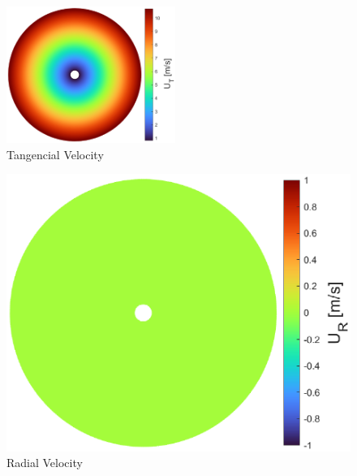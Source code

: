 {\begin{figure}[!htb]
    \centering
    \includegraphics[width=0.49\textwidth]{Figures/comp_method/sim_B/U_T.eps}
    \caption[Tangencial Velocity]{Tangencial Velocity}
    \label{fig:ASDASDA}
\end{figure}

\begin{figure}[!htb]
    \centering
    \begin{minipage}{.49\textwidth}
      \centering
      \includegraphics[width=\textwidth]{Figures/comp_method/sim_B/U_R.eps}
      \caption[Radial Velocity]{Radial Velocity}
      \label{fig:imagem1}
    \end{minipage}%
    \begin{minipage}{.01\textwidth}
         \hfill
    \end{minipage}
    \begin{minipage}{.49\textwidth}
      \centering

\end{minipage}
\end{figure}}
